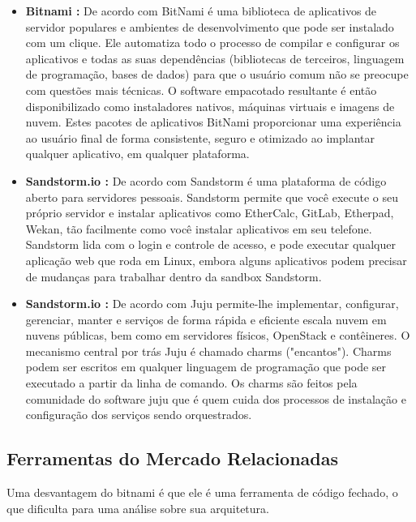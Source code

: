 \begin{itemize}
  \item  \textbf{Bitnami :}
  De acordo com \cite{bitnami} BitNami é uma biblioteca de aplicativos de
  servidor populares e ambientes de desenvolvimento que pode ser instalado
  com um clique. Ele automatiza todo o processo de  compilar e configurar os
   aplicativos e todas as suas dependências (bibliotecas de terceiros,
  linguagem de programação, bases de dados) para que o usuário comum não
  se preocupe com questões mais técnicas. O software empacotado resultante é
  então disponibilizado como instaladores nativos, máquinas virtuais e imagens de nuvem.
  Estes pacotes de aplicativos BitNami proporcionar uma experiência ao usuário final
  de forma consistente, seguro e otimizado ao implantar qualquer aplicativo, em qualquer plataforma.

  \item  \textbf{Sandstorm.io :}
  De acordo com \cite{standstormio} Sandstorm é uma plataforma de código
  aberto para servidores pessoais. Sandstorm permite que você execute o seu próprio
  servidor e instalar aplicativos como EtherCalc, GitLab, Etherpad, Wekan, tão
  facilmente como você instalar aplicativos em seu telefone.
  Sandstorm lida com o login e controle de acesso, e pode executar qualquer aplicação
   web que roda em Linux,  embora alguns aplicativos podem precisar de mudanças para trabalhar
  dentro da sandbox Sandstorm.

 \item  \textbf{Sandstorm.io :}
 De acordo com \citeJuju Juju permite-lhe implementar,
 configurar, gerenciar, manter e serviços de forma rápida e eficiente escala nuvem
 em nuvens públicas, bem como em servidores físicos, OpenStack e contêineres.
 O mecanismo central por trás Juju é chamado charms ("encantos"). Charms podem
 ser escritos em qualquer linguagem de programação que pode ser executado
 a partir da linha de comando. Os charms são feitos pela comunidade do software juju
 que é quem cuida dos processos de instalação e configuração dos serviços sendo orquestrados.

\end{itemize}

\subsection{Ferramentas do Mercado Relacionadas}

Uma desvantagem do bitnami é que ele é uma ferramenta de código fechado, o que
dificulta para uma análise sobre sua arquitetura.

